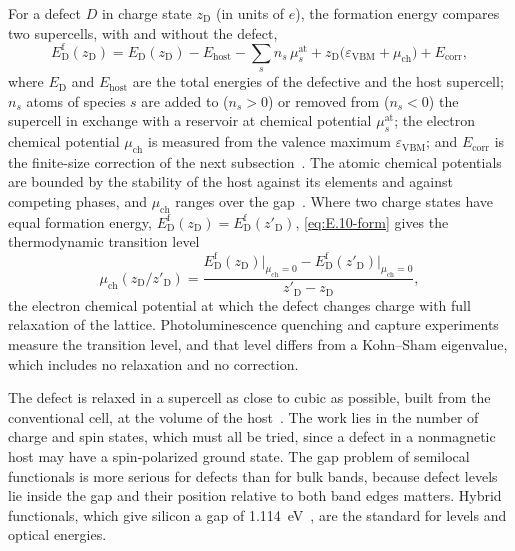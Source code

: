 For a defect $D$ in charge state $z_{\mathrm{D}}$ (in units of $e$), the formation energy compares two supercells, with and without the defect,
\begin{equation}
  E^{\mathrm{f}}_{\mathrm{D}}(z_{\mathrm{D}}) = E_{\mathrm{D}}(z_{\mathrm{D}}) - E_{\mathrm{host}} - \sum_s n_s\,\mu^{\mathrm{at}}_s + z_{\mathrm{D}}\bigl(\varepsilon_{\mathrm{VBM}} + \mu_{\mathrm{ch}}\bigr) + E_{\mathrm{corr}} ,
  \label{eq:E.10-form}
\end{equation}
where $E_{\mathrm{D}}$ and $E_{\mathrm{host}}$ are the total energies of the defective and the host supercell; $n_s$ atoms of species $s$ are added to ($n_s > 0$) or removed from ($n_s < 0$) the supercell in exchange with a reservoir at chemical potential $\mu^{\mathrm{at}}_s$; the electron chemical potential $\mu_{\mathrm{ch}}$ is measured from the valence maximum $\varepsilon_{\mathrm{VBM}}$; and $E_{\mathrm{corr}}$ is the finite-size correction of the next subsection~\cite[Eq.~(3)]{kim2020quickstart}. The atomic chemical potentials are bounded by the stability of the host against its elements and against competing phases, and $\mu_{\mathrm{ch}}$ ranges over the gap~\cite[Sect.~3]{kim2020quickstart}. Where two charge states have equal formation energy, $E^{\mathrm{f}}_{\mathrm{D}}(z_{\mathrm{D}}) = E^{\mathrm{f}}_{\mathrm{D}}(z'_{\mathrm{D}})$, \cref{eq:E.10-form} gives the thermodynamic transition level
\begin{equation}
  \mu_{\mathrm{ch}}(z_{\mathrm{D}}/z'_{\mathrm{D}}) = \frac{E^{\mathrm{f}}_{\mathrm{D}}(z_{\mathrm{D}})\bigr|_{\mu_{\mathrm{ch}}=0} - E^{\mathrm{f}}_{\mathrm{D}}(z'_{\mathrm{D}})\bigr|_{\mu_{\mathrm{ch}}=0}}{z'_{\mathrm{D}} - z_{\mathrm{D}}} ,
  \label{eq:E.10-level}
\end{equation}
the electron chemical potential at which the defect changes charge with full relaxation of the lattice. Photoluminescence quenching and capture experiments measure the transition level, and that level differs from a Kohn--Sham eigenvalue, which includes no relaxation and no correction.

The defect is relaxed in a supercell as close to cubic as possible, built from the conventional cell, at the volume of the host~\cite[Sect.~3]{kim2020quickstart}. The work lies in the number of charge and spin states, which must all be tried, since a defect in a nonmagnetic host may have a spin-polarized ground state. The gap problem of semilocal functionals is more serious for defects than for bulk bands, because defect levels lie inside the gap and their position relative to both band edges matters. Hybrid functionals, which give silicon a gap of \SI{1.114}{eV}~\cite{dhaliah2022first}, are the standard for levels and optical energies.

